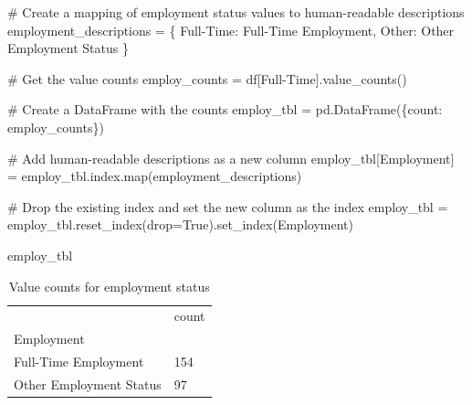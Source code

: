 \documentclass[
  letterpaper,
  DIV=11,
  numbers=noendperiod]{scrartcl}
\newenvironment{Shaded}{\begin{snugshade}}{\end{snugshade}}
\newcommand{\BuiltInTok}[1]{\textcolor[rgb]{0.00,0.23,0.31}{#1}}
\newcommand{\CommentTok}[1]{\textcolor[rgb]{0.37,0.37,0.37}{#1}}
\newcommand{\NormalTok}[1]{\textcolor[rgb]{0.00,0.23,0.31}{#1}}
\newcommand{\OperatorTok}[1]{\textcolor[rgb]{0.37,0.37,0.37}{#1}}
\newcommand{\StringTok}[1]{\textcolor[rgb]{0.13,0.47,0.30}{#1}}
\newcommand{\VariableTok}[1]{\textcolor[rgb]{0.07,0.07,0.07}{#1}}
\begin{document}
\begin{Shaded}
\begin{Highlighting}[]
\CommentTok{\# Create a mapping of employment status values to human{-}readable descriptions}
\NormalTok{employment\_descriptions }\OperatorTok{=}\NormalTok{ \{}
    \StringTok{\textquotesingle{}Full{-}Time\textquotesingle{}}\NormalTok{: }\StringTok{\textquotesingle{}Full{-}Time Employment\textquotesingle{}}\NormalTok{,}
    \StringTok{\textquotesingle{}Other\textquotesingle{}}\NormalTok{: }\StringTok{\textquotesingle{}Other Employment Status\textquotesingle{}}
\NormalTok{\}}

\CommentTok{\# Get the value counts}
\NormalTok{employ\_counts }\OperatorTok{=}\NormalTok{ df[}\StringTok{\textquotesingle{}Full{-}Time\textquotesingle{}}\NormalTok{].value\_counts()}

\CommentTok{\# Create a DataFrame with the counts}
\NormalTok{employ\_tbl }\OperatorTok{=}\NormalTok{ pd.DataFrame(\{}\StringTok{\textquotesingle{}count\textquotesingle{}}\NormalTok{: employ\_counts\})}

\CommentTok{\# Add human{-}readable descriptions as a new column}
\NormalTok{employ\_tbl[}\StringTok{\textquotesingle{}Employment\textquotesingle{}}\NormalTok{] }\OperatorTok{=}\NormalTok{ employ\_tbl.index.}\BuiltInTok{map}\NormalTok{(employment\_descriptions)}

\CommentTok{\# Drop the existing index and set the new column as the index}
\NormalTok{employ\_tbl }\OperatorTok{=}\NormalTok{ employ\_tbl.reset\_index(drop}\OperatorTok{=}\VariableTok{True}\NormalTok{).set\_index(}\StringTok{\textquotesingle{}Employment\textquotesingle{}}\NormalTok{)}

\NormalTok{employ\_tbl}
\end{Highlighting}
\end{Shaded}

{

\begin{longtable}[]{@{}ll@{}}

\caption{\label{tbl-valuecounts-employment}Value counts for employment
status}

\tabularnewline

\toprule\noalign{}
& count \\
Employment & \\
\midrule\noalign{}
\endhead
\bottomrule\noalign{}
\endlastfoot
Full-Time Employment & 154 \\
Other Employment Status & 97 \\

\end{longtable}

}
\end{document}
